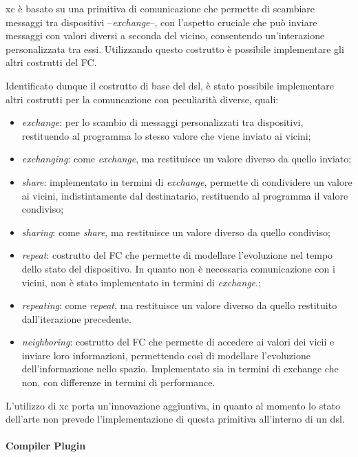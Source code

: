 \documentclass[13pt, a4paper]{article}
\begin{document}
\ac{xc} è basato su una primitiva di comunicazione che permette di scambiare messaggi tra dispositivi --\emph{exchange}--,
    con l'aspetto cruciale che può inviare messaggi con valori diversi a seconda del vicino, consentendo un'interazione
    personalizzata tra essi.
%
Utilizzando questo costrutto è possibile implementare gli altri costrutti del \ac{FC}.

Identificato dunque il costrutto di base del \ac{dsl}, è stato possibile implementare altri costrutti per la comuncazione
    con peculiarità diverse, quali:
\begin{itemize}
    \item \emph{exchange}: per lo scambio di messaggi personalizzati tra dispositivi, restituendo al programma lo stesso
        valore che viene inviato ai vicini;
    \item \emph{exchanging}: come \emph{exchange}, ma restituisce un valore diverso da quello inviato;
    \item \emph{share}: implementato in termini di \emph{exchange}, permette di condividere un valore ai vicini, indistintamente
        dal destinatario, restituendo al programma il valore condiviso;
    \item \emph{sharing}: come \emph{share}, ma restituisce un valore diverso da quello condiviso;
    \item \emph{repeat}: costrutto del \ac{FC} che permette di modellare l'evoluzione nel tempo dello stato del dispositivo.
        In quanto non è necessaria comunicazione con i vicini, non è stato implementato in termini di \emph{exchange}.;
    \item \emph{repeating}: come \emph{repeat}, ma restituisce un valore diverso da quello restituito dall'iterazione precedente.
    \item \emph{neighboring}: costrutto del \ac{FC} che permette di accedere ai valori dei vicii e inviare loro informazioni,
        permettendo così di modellare l'evoluzione dell'informazione nello spazio.
        Implementato sia in termini di exchange che non, con differenze in termini di performance.
\end{itemize}

L'utilizzo di \ac{xc} porta un'innovazione aggiuntiva, in quanto al momento lo stato dell'arte non prevede l'implementazione di
    questa primitiva all'interno di un \ac{dsl}.


\paragraph{Compiler Plugin}
\end{document}
